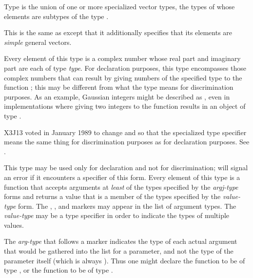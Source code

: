 \begin{flushdesc}
Type  is the union of one or more specialized vector
types, the types of whose elements are subtypes of the type .

\item[\cd{(simple-vector \emph{size})}]
This is the same
as  except that it additionally specifies
that its elements are \emph{simple} general vectors.

\item[\cd{(complex \emph{type})}]
Every element of this type is a
complex number whose real part
and imaginary part are each of type \emph{type}.
For declaration purposes, this type encompasses those complex numbers
that can result by giving numbers of the specified type
to the function ; this may be different
from what the type means for discrimination purposes.
As an example, Gaussian integers might be
described as , even in implementations
where giving two integers to the function  results
in an object of type .

\begin{new}
X3J13 voted in January 1989
to change  and 
so that the specialized 
type specifier means the same thing for discrimination purposes
as for declaration purposes.
See .
\end{new}

\item[\cd{(function (\emph{arg1-type} \emph{arg2-type} ...) \emph{value-type})}]
\relax This type may be used only for declaration and not for
discrimination;  will signal an error if it encounters a specifier of
this form. Every element of this type is
a function that accepts arguments at \emph{least} of the
types specified by the \emph{argj-type} forms and returns a value that is a
member of the types specified by the \emph{value-type} form.  The
, , and  markers
may appear in the list of argument types.
The \emph{value-type} may be a  type specifier
in order to indicate the types of multiple values.

The \emph{arg-type} that
follows a  marker indicates the type of each actual argument
that would be gathered into the list for a  parameter,
and not the type of the  parameter itself (which is always
).  Thus one might declare the function  to
be of type , or
the function  to be of type
.


\end{flushdesc}
